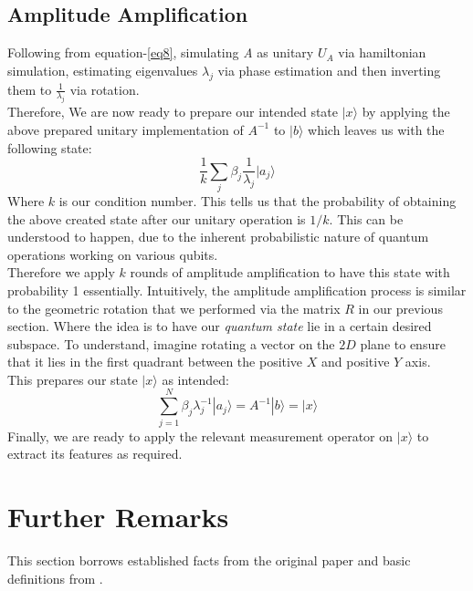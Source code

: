 \documentclass[12pt]{article}
\begin{document}
\subsection{Amplitude Amplification}
Following from equation-\ref{eq8}, simulating \emph{A} as unitary $U_A$ via hamiltonian simulation, estimating eigenvalues $\lambda_j$ via phase estimation and then inverting them to $\frac{1}{\lambda_j}$ via rotation.\\
Therefore, We are now ready to prepare our intended state $|x\rangle$ by applying the above prepared unitary implementation of $A^{-1}$ to $|b\rangle$ which leaves us with the following state:
\begin{displaymath}
    \frac{1}{k}\sum_{j}^{} \beta_j \frac{1}{\lambda_j}|a_j\rangle
\end{displaymath}
Where $k$ is our condition number. This tells us that the probability of obtaining the above created state after our unitary operation is $1/k$. This can be understood to happen, due to the inherent probabilistic nature of quantum operations working on various qubits.\\
Therefore we apply $k$ rounds of amplitude amplification to have this state with probability 1 essentially. Intuitively, the amplitude amplification process is similar to the geometric rotation that we performed via the matrix $R$ in our previous section. Where the idea is to have our \emph{quantum state} lie in a certain desired subspace. To understand, imagine rotating a vector on the $2D$ plane to ensure that it lies in the first quadrant between the positive $X$ and positive $Y$ axis.\\ 
This prepares our state $|x\rangle$ as intended:
\begin{equation} \label{eq10}
    \sum_{j=1}^{N} \beta_j \lambda^{-1}_j |a_j\rangle = A^{-1} |b\rangle = |x\rangle
\end{equation}
Finally, we are ready to apply the relevant measurement operator on $|x\rangle$ to extract its features as required.

\section{Further Remarks}
This section borrows established facts from the original paper\cite{HHL} and basic definitions from \cite{gita}.
\end{document}
